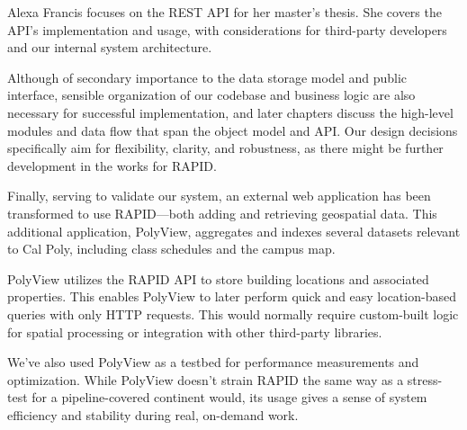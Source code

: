 Alexa Francis focuses on the REST API for her master's thesis. She covers the API's implementation and usage, with considerations for third-party developers and our internal system architecture.

Although of secondary importance to the data storage model and public interface, sensible organization of our codebase and business logic are also necessary for successful implementation, and later chapters discuss the high-level modules and data flow that span the object model and API. Our design decisions specifically aim for flexibility, clarity, and robustness, as there might be further development in the works for RAPID.

\label{polyview_intro}
Finally, serving to validate our system, an external web application has been transformed to use RAPID---both adding and retrieving geospatial data. This additional application, PolyView, aggregates and indexes several datasets relevant to Cal Poly, including class schedules and the campus map.

PolyView utilizes the RAPID API to store building locations and associated properties. This enables PolyView to later perform quick and easy location-based queries with only HTTP requests. This would normally require custom-built logic for spatial processing or integration with other third-party libraries.

We've also used PolyView as a testbed for performance measurements and optimization. While PolyView doesn't strain RAPID the same way as a stress-test for a pipeline-covered continent would, its usage gives a sense of system efficiency and stability during real, on-demand work.

